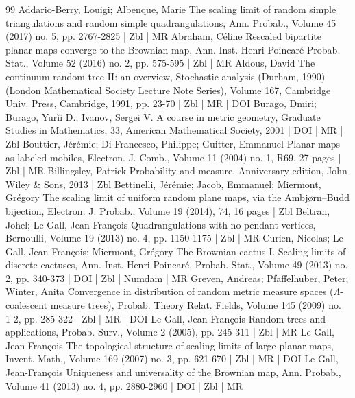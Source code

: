 \begin{thebibliography}{99}
Addario-Berry, Louigi; Albenque, Marie The scaling limit of random simple triangulations and random simple quadrangulations, Ann. Probab., Volume 45 (2017) no. 5, pp. 2767-2825 | Zbl | MR
Abraham, Céline Rescaled bipartite planar maps converge to the Brownian map, Ann. Inst. Henri Poincaré Probab. Stat., Volume 52 (2016) no. 2, pp. 575-595 | Zbl | MR
Aldous, David The continuum random tree II: an overview, Stochastic analysis (Durham, 1990) (London Mathematical Society Lecture Note Series), Volume 167, Cambridge Univ. Press, Cambridge, 1991, pp. 23-70 | Zbl | MR | DOI
Burago, Dmiri; Burago, Yurĭi D.; Ivanov, Sergei V. A course in metric geometry, Graduate Studies in Mathematics, 33, American Mathematical Society, 2001 | DOI | MR | Zbl
Bouttier, Jérémie; Di Francesco, Philippe; Guitter, Emmanuel Planar maps as labeled mobiles, Electron. J. Comb., Volume 11 (2004) no. 1, R69, 27 pages | Zbl | MR
Billingsley, Patrick Probability and measure. Anniversary edition, John Wiley \& Sons, 2013 | Zbl
Bettinelli, Jérémie; Jacob, Emmanuel; Miermont, Grégory The scaling limit of uniform random plane maps, via the Ambjørn–Budd bijection, Electron. J. Probab., Volume 19 (2014), 74, 16 pages | Zbl
Beltran, Johel; Le Gall, Jean-François Quadrangulations with no pendant vertices, Bernoulli, Volume 19 (2013) no. 4, pp. 1150-1175 | Zbl | MR
Curien, Nicolas; Le Gall, Jean-François; Miermont, Grégory The Brownian cactus I. Scaling limits of discrete cactuses, Ann. Inst. Henri Poincaré, Probab. Stat., Volume 49 (2013) no. 2, pp. 340-373 | DOI | Zbl | Numdam | MR
Greven, Andreas; Pfaffelhuber, Peter; Winter, Anita Convergence in distribution of random metric measure spaces ($\Lambda $-coalescent measure trees), Probab. Theory Relat. Fields, Volume 145 (2009) no. 1-2, pp. 285-322 | Zbl | MR | DOI
Le Gall, Jean-François Random trees and applications, Probab. Surv., Volume 2 (2005), pp. 245-311 | Zbl | MR
Le Gall, Jean-François The topological structure of scaling limits of large planar maps, Invent. Math., Volume 169 (2007) no. 3, pp. 621-670 | Zbl | MR | DOI
Le Gall, Jean-François Uniqueness and universality of the Brownian map, Ann. Probab., Volume 41 (2013) no. 4, pp. 2880-2960 | DOI | Zbl | MR

\end{thebibliography}
